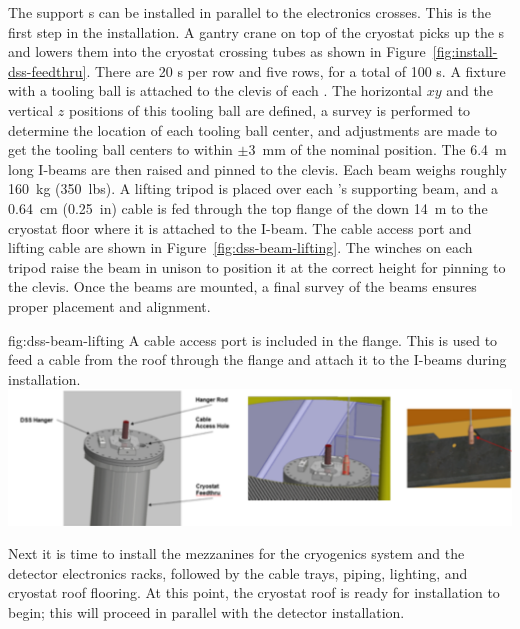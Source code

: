 The  support \fdth{}s can be installed in parallel to the  electronics crosses. This is the first step in the  installation. 
A gantry crane on top of the cryostat picks up the \fdth{}s  and lowers them into the cryostat crossing tubes as shown in Figure~\ref{fig:install-dss-feedthru}. 
There are \num{20} \fdth{}s per row and five rows, for a total of \num{100} \fdth{}s.  A fixture with a tooling ball is attached to the clevis of each \fdth{}.  
The horizontal $xy$ and the vertical $z$ positions of this tooling ball are defined, a survey is performed to determine the location of each tooling ball center, and adjustments are made to get the tooling ball centers to within $\pm$\SI{3}{mm} of the nominal position. %
The \SI{6.4}{m} long I-beams are then raised and pinned to the clevis.  
Each beam weighs roughly \SI{160}{kg} (\SI{350}{lbs}). 
A lifting tripod is placed over each  \fdth{}'s supporting beam, and a \SI{0.64}{cm} (\SI{0.25}{in})  cable is fed through the top flange of the \fdth down \SI{14}{m} to the cryostat floor where it is attached to the I-beam. 
The cable access port and lifting cable are shown in Figure~\ref{fig:dss-beam-lifting}. 
The winches on each tripod raise the beam in unison to position it at the correct height for pinning to the \fdth clevis.  Once the beams are mounted, a final survey of the beams ensures proper placement and alignment. 
 \begin{dunefigure}{fig:dss-beam-lifting}
  {A cable access port is included in the  flange. This is used to feed a cable from the roof through the flange and attach it to the I-beams during  installation.}
 \includegraphics[width=.95\textwidth]{graphics/dss-beam-lifting.pdf}
\end{dunefigure}


Next it is time to install the mezzanines for the cryogenics system and the detector electronics racks, followed by %
the cable trays,  piping, lighting, and cryostat roof flooring. At this point, the cryostat roof is ready for  installation to begin; this will proceed in parallel with the detector installation.





